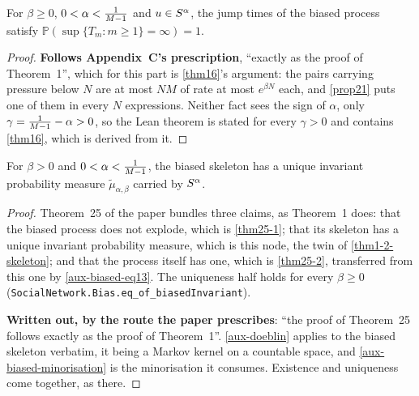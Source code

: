 \begin{theorem}
  \label{thm25-1}
  \leanok
  For $\beta \ge 0$, $0 < \alpha < \tfrac{1}{M-1}$ and $u \in S^\alpha$, the jump
  times of the biased process satisfy $\mathbb{P}(\sup\{T_m : m \ge 1\} =
  \infty) = 1$.
\end{theorem}
\begin{proof}
  \leanok
  \textbf{Follows Appendix~C's prescription}, ``exactly as the proof of
  Theorem~1'', which for this part is \ref{thm16}'s argument: the pairs carrying
  pressure below $N$ are at most $NM$ of rate at most $e^{\beta N}$ each, and
  \ref{prop21} puts one of them in every $N$ expressions.  Neither fact sees the
  sign of $\alpha$, only $\gamma = \tfrac{1}{M-1} - \alpha > 0$, so the Lean theorem
  is stated for every $\gamma > 0$ and contains \ref{thm16}, which is derived
  from it.
\end{proof}

\begin{theorem}
  \label{thm25}
  \leanok
  For $\beta > 0$ and $0 < \alpha < \tfrac{1}{M-1}$, the biased skeleton has a unique
  invariant probability measure $\tilde{\mu}_{\alpha,\beta}$ carried by $S^\alpha$.
\end{theorem}
\begin{proof}
  \leanok
  Theorem~25 of the paper bundles three claims, as Theorem~1 does: that the
  biased process does not explode, which is \ref{thm25-1}; that its skeleton
  has a unique invariant probability measure, which is this node, the twin of
  \ref{thm1-2-skeleton}; and that the process itself has one, which is
  \ref{thm25-2}, transferred from this one by \ref{aux-biased-eq13}.  The
  uniqueness half holds for every $\beta \ge 0$
  (\texttt{SocialNetwork.Bias.eq\_of\_biasedInvariant}).

  \textbf{Written out, by the route the paper prescribes}: ``the proof of
  Theorem~25 follows exactly as the proof of Theorem~1''. \ref{aux-doeblin}
  applies to the biased skeleton verbatim, it being a Markov kernel on a
  countable space, and \ref{aux-biased-minorisation} is the minorisation it
  consumes.  Existence and uniqueness come together, as there.
\end{proof}

